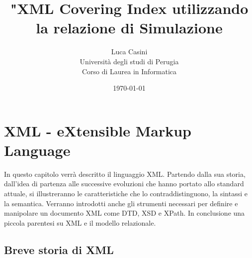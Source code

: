 \documentclass[12pt,a4paper,openright,twoside]{report}
\theoremstyle{definition}
\begin{document}
\begin{titlepage}
\title{"XML Covering Index utilizzando la relazione di Simulazione}
\date{\today}
\author{Luca Casini\\Università degli studi di Perugia\\Corso di Laurea in Informatica}
\end{titlepage}
\maketitle
\tableofcontents
\newpage
\section{XML - eXtensible Markup Language}
In questo capitolo verrà descritto il linguaggio XML. Partendo dalla sua storia, dall'idea di partenza alle successive evoluzioni che hanno portato allo standard attuale, si illustreranno le caratteristiche che lo contraddistinguono, la sintassi e la semantica. Verranno introdotti anche gli strumenti necessari per definire e manipolare un documento XML come DTD, XSD e XPath. In conclusione una piccola parentesi su XML e il modello relazionale.
\subsection{Breve storia di XML}
\end{document}
